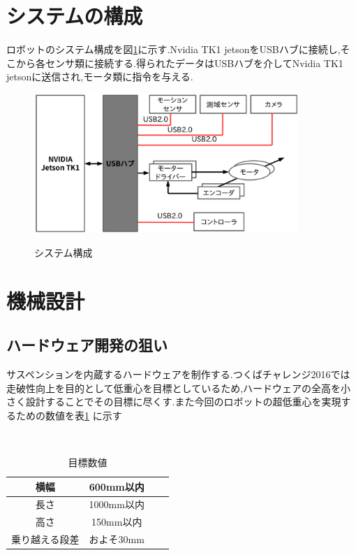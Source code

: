 \documentclass[12pt,oneside]{sotsuken_paper}
\begin{document}
\section{システムの構成}
ロボットのシステム構成を図\ref{fig:sisutemu}に示す.Nvidia TK1 jetsonをUSBハブに接続し,そこから各センサ類に接続する.得られたデータはUSBハブを介してNvidia TK1 jetsonに送信され,モータ類に指令を与える.
\begin{figure}[htp]
 \begin{center}
  \includegraphics[width=100mm]{img/hard/sisutemu.png}
 　\caption{システム構成}
  \label{fig:sisutemu}%
 \end{center}
\end{figure}
\section{機械設計}

\subsection{ハードウェア開発の狙い}
サスペンションを内蔵するハードウェアを制作する.つくばチャレンジ2016では走破性向上を目的として低重心を目標としているため,ハードウェアの全高を小さく設計することでその目標に尽くす.また今回のロボットの超低重心を実現するための数値を表\ref{tab:joken} に示す

\begin{table}[htp]
 　\begin{center}
    \caption{目標数値}
  \begin{tabular}{|c|c|c|c|} \hline
横幅 & 600mm以内  \\  \hline
長さ & 1000mm以内\\ \hline
高さ & 150mm以内 \\ \hline
    乗り越える段差 & およそ30mm  \\ \hline
  \end{tabular}
　   \label{tab:joken}
  \end{center}
\end{table}
\end{document}
